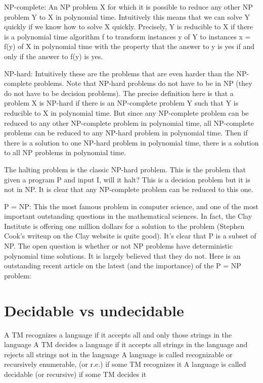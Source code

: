 \documentclass[10 pt]{article}
\begin{document}
NP-complete: An NP problem X for which it is possible to reduce any other NP problem Y to X in polynomial time. Intuitively this means that we can solve Y quickly if we know how to solve X quickly. Precisely, Y is reducible to X if there is a polynomial time algorithm f to transform instances y of Y to instances x = f(y) of X in polynomial time with the property that the answer to y is yes if and only if the answer to f(y) is yes.

NP-hard: Intuitively these are the problems that are even harder than the NP-complete problems. Note that NP-hard problems do not have to be in NP (they do not have to be decision problems). The precise definition here is that a problem X is NP-hard if there is an NP-complete problem Y such that Y is reducible to X in polynomial time. But since any NP-complete problem can be reduced to any other NP-complete problem in polynomial time, all NP-complete problems can be reduced to any NP-hard problem in polynomial time. Then if there is a solution to one NP-hard problem in polynomial time, there is a solution to all NP problems in polynomial time.

The halting problem is the classic NP-hard problem. This is the problem that given a program P and input I, will it halt? This is a decision problem but it is not in NP. It is clear that any NP-complete problem can be reduced to this one.

P = NP: This the most famous problem in computer science, and one of the most important outstanding questions in the mathematical sciences. In fact, the Clay Institute is offering one million dollars for a solution to the problem (Stephen Cook's writeup on the Clay website is quite good). It's clear that P is a subset of NP. The open question is whether or not NP problems have deterministic polynomial time solutions. It is largely believed that they do not. Here is an outstanding recent article on the latest (and the importance) of the P = NP problem: 


\section{Decidable vs undecidable}
A TM recognizes a language if it accepts all
and only those strings in the language
A TM decides a language if it accepts all
strings in the language and rejects all strings
not in the language
A language is called recognizable or
recursively enumerable, (or r.e.)
if some TM recognizes it
A language is called decidable (or recursive)
if some TM decides it
\end{document}
